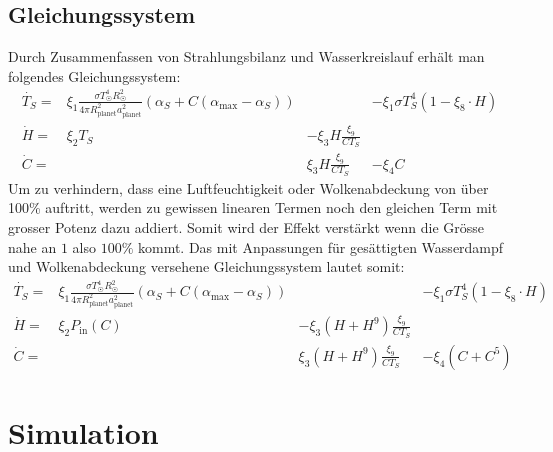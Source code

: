 \begin{refsection}
\subsection{Gleichungssystem}

Durch Zusammenfassen von Strahlungsbilanz und Wasserkreislauf erhält man folgendes Gleichungssystem:
\begin{equation}
\begin{matrix}
\dot{T_S} = & \xi_1 \frac{\sigma T_{\astrosun}^4 R_{\astrosun}^2}{4 \pi R_{\text{planet}}^2 a_{\text{planet}}^2} (\alpha_S + C(\alpha_{\text{max}} - \alpha_S)) && - \xi_1 \sigma T_{S}^4  (1 - \xi_8 \cdot H)\\
\dot{H}   = & \xi_2 T_S              & - \xi_3 H \frac{\xi_9}{C T_S}          & \\
\dot{C}   = &                        &   \xi_3 H \frac{\xi_9}{C T_S}          & - \xi_4 C
\end{matrix}
\end{equation}
Um zu verhindern, dass eine Luftfeuchtigkeit oder Wolkenabdeckung von über 100\% auftritt, werden zu gewissen linearen Termen noch den gleichen Term mit grosser Potenz dazu addiert. Somit wird der Effekt verstärkt wenn die Grösse nahe an $1$ also $100\%$ kommt. Das mit Anpassungen für gesättigten Wasserdampf und Wolkenabdeckung versehene Gleichungssystem lautet somit:
\begin{equation}
\begin{matrix}
\dot{T_S} = & \xi_1 \frac{\sigma T_{\astrosun}^4 R_{\astrosun}^2}{4 \pi R_{\text{planet}}^2 a_{\text{planet}}^2} (\alpha_S + C(\alpha_{\text{max}} - \alpha_S)) && - \xi_1 \sigma T_{S}^4  (1 - \xi_8 \cdot H)\\
\dot{H}   = & \xi_2 P_{\text{in}}(C) & - \xi_3 (H + H^9) \frac{\xi_9}{C T_S}   &                   \\
\dot{C}   = &                        &   \xi_3 (H + H^9) \frac{\xi_9}{C T_S}   & - \xi_4 (C + C^5)
\end{matrix}
\end{equation}


\section{Simulation}


\end{refsection}
